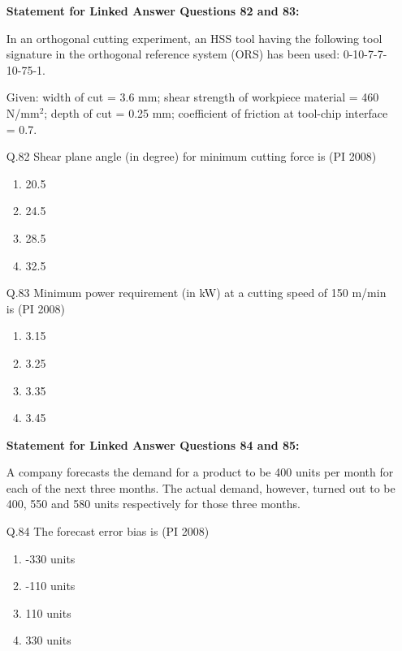 \documentclass[journal,12pt,onecolumn]{IEEEtran}
\theoremstyle{remark}
\begin{document}
\begin{enumerate}
\textbf{Statement for Linked Answer Questions 82 and 83:}

In an orthogonal cutting experiment, an HSS tool having the following tool signature in the orthogonal reference system (ORS) has been used: 0-10-7-7-10-75-1.  

Given: width of cut = 3.6 mm; shear strength of workpiece material = 460 N/mm$^2$;  
depth of cut = 0.25 mm; coefficient of friction at tool-chip interface = 0.7.  


    \item[\textnormal{Q.82}] Shear plane angle (in degree) for minimum cutting force is \hfill{(PI 2008)} 
    \begin{enumerate}[label=(\Alph*)]
        \item 20.5
        \item 24.5
        \item 28.5
        \item 32.5
    \end{enumerate}

    \item[\textnormal{Q.83}] Minimum power requirement (in kW) at a cutting speed of 150 m/min is  \hfill{(PI 2008)}
    \begin{enumerate}[label=(\Alph*)]
        \item 3.15
        \item 3.25
        \item 3.35
        \item 3.45
    \end{enumerate}


\textbf{Statement for Linked Answer Questions 84 and 85:}

A company forecasts the demand for a product to be 400 units per month for each of the next three months. The actual demand, however, turned out to be 400, 550 and 580 units respectively for those three months.


    \item[\textnormal{Q.84}] The forecast error bias is \hfill{(PI 2008)} 
    \begin{enumerate}[label=(\Alph*)]
        \item -330 units
        \item -110 units
        \item 110 units
        \item 330 units
    \end{enumerate}


\end{enumerate}
\end{document}
